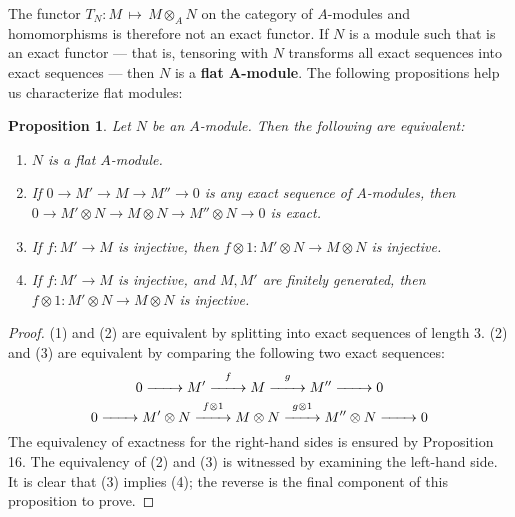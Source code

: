 \documentclass[11pt]{article}
\newtheorem{proposition}{Proposition}
\renewcommand{\longrightarrow}{\xrightarrow{\hspace*{0.7cm}}}
\begin{document}
The functor $T_{N} : M \, \mapsto \, M \otimes_{A} N$ on the category of $A$-modules and homomorphisms is therefore not an exact functor. If $N$ is a module such that is an exact functor --- that is, tensoring with $N$ transforms all exact sequences into exact sequences --- then $N$ is a \textbf{flat A-module}. The following propositions help us characterize flat modules:

\begin{adjustwidth}{0.5cm}{}
  \begin{proposition}
    Let $N$ be an $A$-module. Then the following are equivalent:
    \begin{enumerate}
      \item $N$ is a flat $A$-module.
      \item If $0 \to M' \to M \to M'' \to 0$ is any exact sequence of $A$-modules, then $0 \to M' \otimes N \to M \otimes N \to M'' \otimes N \to 0$ is exact.
      \item If $f : M' \to M$ is injective, then $f \otimes 1 : M' \otimes N \to M \otimes N$ is injective.
      \item If $f : M' \to M$ is injective, and $M, M'$ are finitely generated, then $f \otimes 1 : M' \otimes N \to M \otimes N$ is injective.
    \end{enumerate}
  \end{proposition}
  \begin{proof}
    (1) and (2) are equivalent by splitting into exact sequences of length $3$. (2) and (3) are equivalent by comparing the following two exact sequences:
    \[
      0 \longrightarrow M' \stackrel{f}{\longrightarrow} M \stackrel{g}{\longrightarrow} M'' \longrightarrow 0 \\
    \]
    \[
      0 \longrightarrow M' \otimes N \stackrel{f \otimes 1}{\longrightarrow} M \otimes N \stackrel{g \otimes 1}{\longrightarrow} M'' \otimes N \longrightarrow 0 \\
    \]
    The equivalency of exactness for the right-hand sides is ensured by Proposition 16. The equivalency of (2) and (3) is witnessed by examining the left-hand side. It is clear that (3) implies (4); the reverse is the final component of this proposition to prove.
  \end{proof}
\end{adjustwidth}

\end{document}
